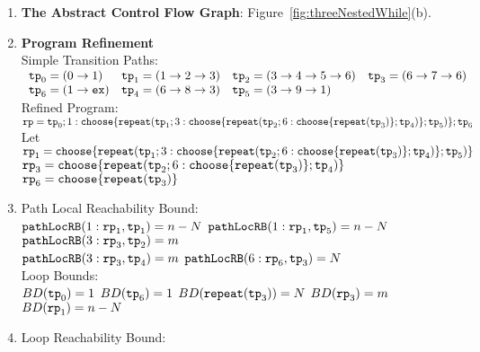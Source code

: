 \begin{enumerate}
  \item  \textbf{The Abstract Control Flow Graph}: Figure~\ref{fig:threeNestedWhile}(b).

  \item \textbf{Program Refinement}
  \\
  {Simple Transition Paths:}
  \\
$
      \begin{array}{llll}
          \mathtt{tp}_0 = (0 \to 1)
          &
          \mathtt{tp}_1 = (1 \to 2 \to 3)
          &           
          \mathtt{tp}_2 = (3 \to 4 \to 5 \to 6)
          &
          \mathtt{tp}_3 = (6 \to 7 \to 6)
          \\
          \mathtt{tp}_6 = (1 \to \mathtt{ex})
          &
          \mathtt{tp}_4 = (6 \to 8 \to 3)
          &
          \mathtt{tp}_5 = (3 \to 9 \to 1)
      \end{array}
$
  \\
  Refined Program:
\\
$
  \rprog = \tpath_0 ; 
1: \rpchoose{\rprepeat(\tpath_1; 3: \rpchoose{\rprepeat(\tpath_2; 6 : \rpchoose{\rprepeat(\tpath_3)}; \tpath_4)}; \tpath_5)}; \tpath_6
$
\\
Let $\rprog_1 = \rpchoose{\rprepeat(\tpath_1; 3: \rpchoose{\rprepeat(\tpath_2; 6 : \rpchoose{\rprepeat(\tpath_3)}; \tpath_4)}; \tpath_5)}$
\\
$\rprog_3 = \rpchoose{\rprepeat(\tpath_2; 6 : \rpchoose{\rprepeat(\tpath_3)}; \tpath_4)}$
\\
$\rprog_6 = \rpchoose{\rprepeat(\tpath_3)}$
  \item {Path Local Reachability Bound}:
\\
$\mathtt{pathLocRB}(1: \mathtt{rp}_1, \mathtt{tp}_1) = n - N$ \quad
$\mathtt{pathLocRB}(1: \mathtt{rp}_1, \mathtt{tp}_5) = n - N$ \quad
$\mathtt{pathLocRB}(3: \mathtt{rp}_3, \mathtt{tp}_2) = m$ \\
$\mathtt{pathLocRB}(3: \mathtt{rp}_3, \mathtt{tp}_4) = m$ \quad
$\mathtt{pathLocRB}(6: \mathtt{rp}_6, \mathtt{tp}_3) = N$ \quad
%
\\
Loop Bounds:
\\
$BD(\mathtt{tp}_0) = 1$
\quad
$BD(\mathtt{tp}_6) = 1$
\quad
$BD( \mathtt{repeat}(\mathtt{tp}_3)) = N $
\quad
$BD(\mathtt{rp}_3) = m $
\quad
$BD(\mathtt{rp}_1) = n - N $
%
\item Loop Reachability Bound:
\\
\end{enumerate}
